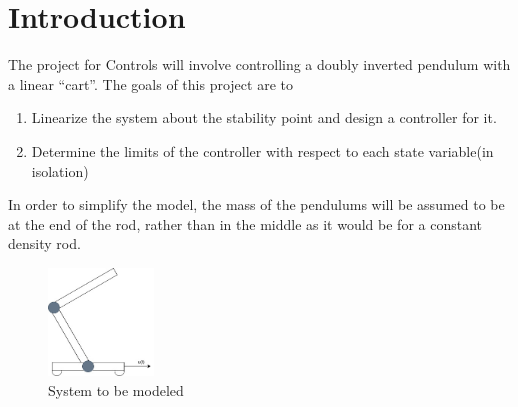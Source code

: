\section{Introduction}

The project for Controls will involve controlling a doubly inverted pendulum with a linear ``cart''. The goals
of this project are to
\begin{enumerate}
\item Linearize the system about the stability point and design a controller for it.
\item Determine the limits of the controller with respect to each state variable(in isolation) 
\end{enumerate}

In order to simplify the model, the mass of the pendulums will be assumed to be at the end of the rod, rather
than in the middle as it would be for a constant density rod.

\begin{figure}[h]
  \centering
  \includegraphics[width=0.25\textwidth]{../resources/doublyInvertedPendulum.jpg}
  \caption{System to be modeled}
  \label{}
\end{figure}
